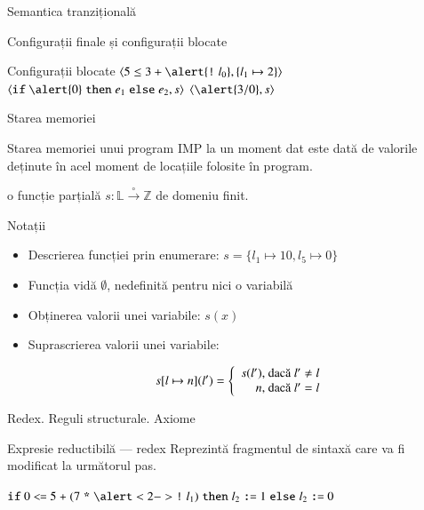 \documentclass[xcolor=pdftex,romanian,colorlinks]{beamer}
\begin{document}
\begin{section}{Semantica tranzițională}
\begin{frame}{Configurații finale și configurații blocate}
\begin{alertblock}{Configurații blocate}
\hfill $\c{5 \leq {3 + {\alert{\terminal{!} l_0}}}, \{l_1\mapsto 2\}}$ \hfill $\c{\Sif \alert{0} \Sthen e_1 \Selse e_2,\stare}$ \hfill $\c{\alert{3 / 0}, \stare}$ \hfill\;
\end{alertblock}

\end{frame}


\begin{frame}{Starea memoriei}
\begin{block}{}
Starea memoriei unui program IMP la un moment dat este dată de valorile deținute în acel moment de locațiile folosite în program.

 o funcție \alert{parțială} $s : \mathbb{L} \xrightarrow{\circ}\mathbb{Z}$ de domeniu finit.
\end{block}
\begin{block}{Notații}
\begin{itemize}
\item Descrierea funcției prin enumerare:
$s = \{ l_1 \mapsto 10, l_5 \mapsto 0\}$
\item Funcția vidă $\emptyset$, nedefinită pentru nici o variabilă
\item Obținerea valorii unei variabile: $s(x)$
\item Suprascrierea valorii unei variabile:

$$s[l\mapsto n] (l') = \left\{\begin{array}{r@{\mbox{, dacă }}l}
s	(l') & l' \neq l \\
n & l' = l
\end{array}
\right.$$
\end{itemize}
\end{block}
\end{frame}


\begin{frame}{Redex. Reguli structurale. Axiome}
\begin{block}{\alert{Ex}presie \alert{red}uctibilă --- \alert{redex}}
Reprezintă fragmentul de sintaxă care va fi modificat la următorul pas.

\hfill$\Sif 0 \terminal{<=} 5 \terminal{+} (7 \terminal{*} \alert<2->{\terminal{!} l_1}) \Sthen  l_2 \terminal{:=}1 \Selse l_2 \terminal{:=}0 $\hfill\ 
\end{block}


\end{frame}
\end{section}
\end{document}
